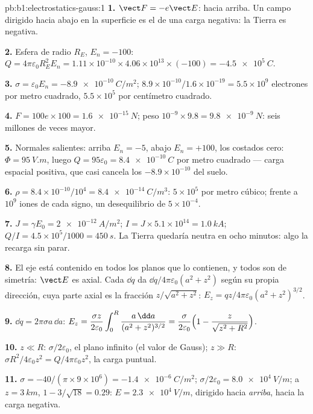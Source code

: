 \begin{solution}{pb:b1:electrostatics-gauss:1}
\textbf{1.} $\vect F = -e\vect E$: hacia arriba. Un campo dirigido hacia
abajo en la superficie es el de una carga negativa: la Tierra es negativa.

\textbf{2.} Esfera de radio $R_E$, $E_n = -100$: $Q = 4\pi\varepsilon_0R_E^2E_n =
1.11 \times 10^{-10} \times 4.06 \times 10^{13} \times (-100) = \qty{-4.5e5}{C}$.

\textbf{3.} $\sigma = \varepsilon_0E_n = \qty{-8.9e-10}{C/m^2}$; $8.9 \times 10^{-10}/1.6 \times
10^{-19} = 5.5 \times 10^9$ electrones por metro cuadrado, $5.5 \times 10^5$ por
centímetro cuadrado.

\textbf{4.} $F = 100e \times 100 = \qty{1.6e-15}{N}$; peso $10^{-9} \times 9.8 =
\qty{9.8e-9}{N}$: seis millones de veces mayor.

\textbf{5.} Normales salientes: arriba $E_n = -5$, abajo $E_n = +100$, los
costados cero: $\Phi = \qty{95}{V.m}$, luego $Q = 95\varepsilon_0 = \qty{+8.4e-10}{C}$ por metro
cuadrado --- carga espacial positiva, que casi cancela los
$-8.9 \times 10^{-10}$ del suelo.

\textbf{6.} $\rho = 8.4 \times 10^{-10}/10^4 = \qty{8.4e-14}{C/m^3}$: $5 \times 10^5$
 por metro cúbico; frente a $10^9$ iones de cada signo,
un desequilibrio de $5 \times 10^{-4}$.

\textbf{7.} $J = \gamma E_0 = \qty{2e-12}{A/m^2}$; $I = J \times 5.1 \times 10^{14} =
\qty{1.0}{kA}$; $Q/I = 4.5 \times 10^5/1000 = \qty{450}{s}$. La Tierra quedaría
neutra en ocho minutos: algo la recarga sin parar.

\textbf{8.} El eje está contenido en todos los planos que lo contienen, y
todos son de simetría: $\vect E$ es axial. Cada $\dd q$ da $\dd q/4\pi\varepsilon_0(a^2 + z^2)$
según su propia dirección, cuya parte axial es la fracción
$z/\sqrt{a^2 + z^2}$: $E_z = qz/4\pi\varepsilon_0(a^2 + z^2)^{3/2}$.

\textbf{9.} $\dd q = 2\pi\sigma a\,\dd a$: $E_z = \dfrac{\sigma z}{2\varepsilon_0}\displaystyle\int_0^R
\dfrac{a\,\dd a}{(a^2 + z^2)^{3/2}} = \dfrac{\sigma}{2\varepsilon_0}\Bigl(1 - \dfrac{z}{\sqrt{z^2
+ R^2}}\Bigr)$.

\textbf{10.} $z \ll R$: $\sigma/2\varepsilon_0$, el plano infinito (el valor de Gauss);
$z \gg R$: $\sigma R^2/4\varepsilon_0z^2 = Q/4\pi\varepsilon_0z^2$, la carga puntual.

\textbf{11.} $\sigma = -40/(\pi \times 9 \times 10^6) = \qty{-1.4e-6}{C/m^2}$; $\sigma/2\varepsilon_0 =
\qty{8.0e4}{V/m}$; a $z = \qty{3}{km}$, $1 - 3/\sqrt{18} = 0.29$: $E =
\qty{2.3e4}{V/m}$, dirigido hacia \emph{arriba}, hacia la carga negativa.


\end{solution}
